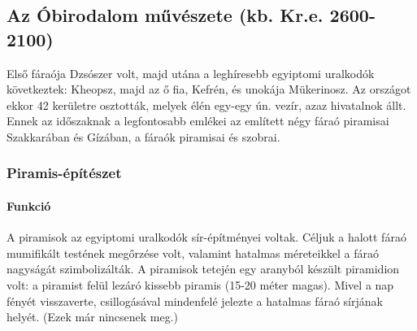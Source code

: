 \hfill

\subsection*{Az Óbirodalom művészete (kb. Kr.e. 2600-2100)}

Első fáraója Dzsószer volt, majd utána a leghíresebb egyiptomi uralkodók következtek: Kheopsz, majd az ő fia, Kefrén, és unokája Mükerinosz. Az országot ekkor 42 kerületre osztották, melyek élén egy-egy ún. vezír, azaz hivatalnok állt. Ennek az időszaknak a legfontosabb emlékei az említett négy fáraó piramisai Szakkarában és Gízában, a fáraók piramisai és szobrai.

\subsubsection*{Piramis-építészet}

\paragraph{Funkció} A piramisok az egyiptomi uralkodók sír-építményei voltak. Céljuk a halott fáraó mumifikált testének megőrzése volt, valamint hatalmas méreteikkel a fáraó nagyságát szimbolizálták. A piramisok tetején egy aranyból készült piramidion volt: a piramist felül lezáró kissebb piramis (15-20 méter magas). Mivel a nap fényét visszaverte, csillogásával mindenfelé jelezte a hatalmas fáraó sírjának helyét. (Ezek már nincsenek meg.)

